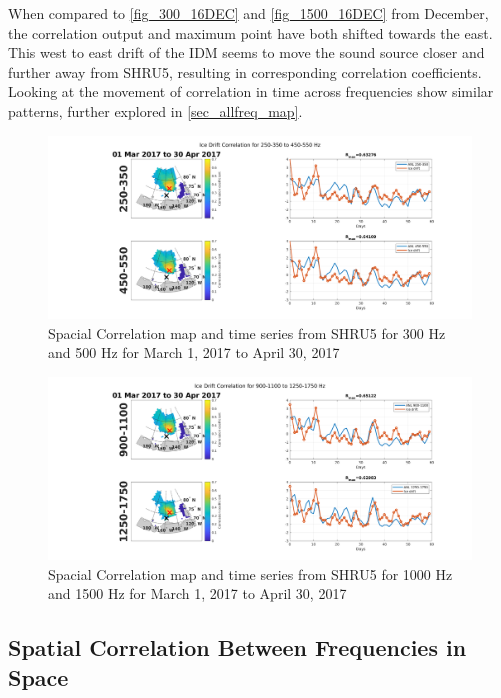 When compared to \autoref{fig_300_16DEC} and \autoref{fig_1500_16DEC} from December, the correlation output and maximum point have both shifted towards the east. This west to east drift of the IDM seems to move the sound source closer and further away from SHRU5, resulting in corresponding correlation coefficients. Looking at the movement of correlation in time across frequencies show similar patterns, further explored in \autoref{sec_allfreq_map}.


\begin{figure}[p]
\centering
\includegraphics[scale=0.35]{Figures/low_spatial_corr_20170301-20170430.png}
\caption{Spacial Correlation map and time series from SHRU5 for 300 Hz and 500 Hz for March 1, 2017 to April 30, 2017}
\label{fig_300_500corr}
\end{figure}


\begin{figure}[p]
\centering
\includegraphics[scale=0.35]{Figures/high_spatial_corr_20170301-20170430.png}
\caption{Spacial Correlation map and time series from SHRU5 for 1000 Hz and 1500 Hz for March 1, 2017 to April 30, 2017}
\label{fig_1000_1500corr}
\end{figure}



\subsection{Spatial Correlation Between Frequencies in Space}  \label{sec_allfreq_map}


